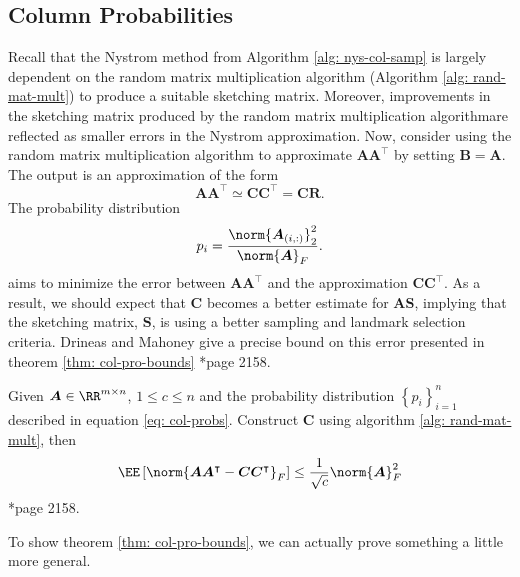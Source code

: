 \subsection{Column Probabilities}\label{Section2.2}

Recall that the Nystrom method from Algorithm \ref{alg: nys-col-samp} is largely dependent on the random matrix multiplication algorithm (Algorithm \ref{alg: rand-mat-mult}) to produce a suitable sketching matrix. Moreover, improvements in the sketching matrix produced by the random matrix multiplication algorithmare reflected as smaller errors in the Nystrom approximation. Now, consider using the random matrix multiplication algorithm to approximate $\bm{A} \bm{A}^{\intercal}$ by setting $\bm{B} = \bm{A}$. The output is an approximation of the form
\begin{equation*}
    \bm{A} \bm{A}^{\intercal} \simeq \bm{C} \bm{C}^{\intercal} = \bm{C} \bm{R}.
\end{equation*}
The probability distribution
\begin{equation*} \label{eq: col-probs}
    p_i = \frac{\norm{\bm{A}_{(i,:)}}_2^2}{\norm{\bm{A}}_F}.
\end{equation*}
aims to minimize the error between $\bm{A} \bm{A}^{\intercal}$ and the approximation $\bm{C} \bm{C}^{\intercal}$. As a result, we should expect that $\bm{C}$ becomes a better estimate for $\bm{A} \bm{S}$, implying that the sketching matrix, $\bm{S}$, is using a better sampling and landmark selection criteria. Drineas and Mahoney give a precise bound on this error presented in theorem \ref{thm: col-pro-bounds} \cite{JMLR:v6:drineas05a}*{page 2158}.

\begin{thm} \label{thm: col-pro-bounds}
    Given $\bm{A} \in \RR^{m \times n}$, $1 \leq c \leq n$ and the probability distribution $\left\{ p_i \right\}_{i=1}^{n}$ described in equation \ref{eq: col-probs}. Construct $\bm{C}$ using algorithm \ref{alg: rand-mat-mult}, then
    \[
        \EE \left[ \norm{\bm{A} \bm{A}^{\intercal} - \bm{C} \bm{C}^{\intercal}}_{F} \right] \leq \frac{1}{\sqrt{c}} \norm{\bm{A}}^2_{F}
    \]
    \cite{JMLR:v6:drineas05a}*{page 2158}.
\end{thm}

To show theorem \ref{thm: col-pro-bounds}, we can actually prove something a little more general.

